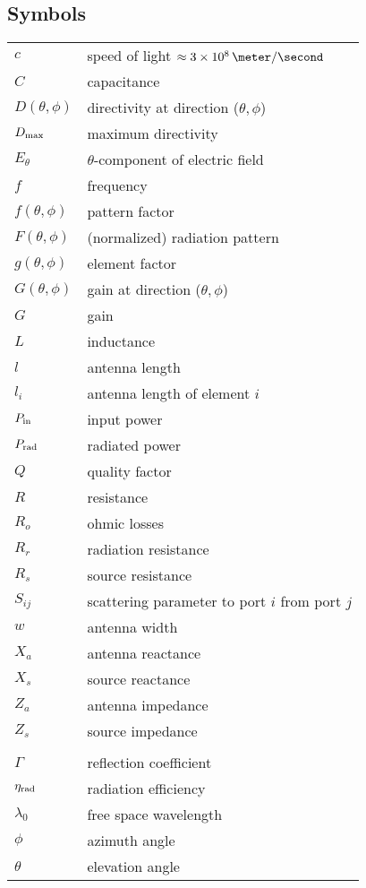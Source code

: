 \subsection*{Symbols}

\begin{tabular}{ll}

$c$           & speed of light $\approx 3\times10^8\,\meter/\second$\\
$C$           & capacitance\\
$D(\theta,\phi)$  & directivity at direction ($\theta,\phi$)\\
${D}_{\mathrm{max}}$    & maximum directivity\\
$E_\theta$   & $\theta$-component of electric field\\
$f$          & frequency\\
$f(\theta,\phi)$ & pattern factor\\
$F(\theta,\phi)$ & (normalized) radiation pattern\\
$g(\theta,\phi)$ & element factor\\
$G(\theta,\phi)$ & gain at direction ($\theta,\phi$)\\
$G$          & gain\\
$L$          & inductance\\
$l$          & antenna length\\
$l_i$        & antenna length of element $i$\\
${P}_{\mathrm{in}}$     & input power\\
${P}_{\mathrm{rad}}$    & radiated power\\
$Q$          & quality factor\\
$R$          & resistance\\
$R_o$        & ohmic losses\\
$R_r$        & radiation resistance\\
$R_s$        & source resistance\\
$S_{ij}$     & scattering parameter to port $i$ from port $j$ \\
$w$          & antenna width\\
$X_a$        & antenna reactance\\
$X_s$        & source reactance\\
$Z_a$        & antenna impedance\\
$Z_s$        & source impedance\\
& \\
$\Gamma$     & reflection coefficient\\
${\eta}_{\mathrm{rad}}$ & radiation efficiency \\
$\lambda_0$  & free space wavelength\\
$\phi$       & azimuth angle\\
$\theta$     & elevation angle\\


\end{tabular}

